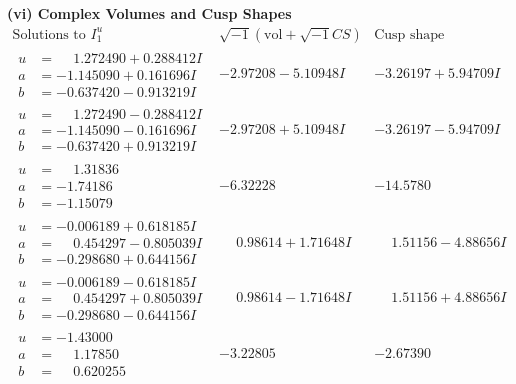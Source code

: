 \documentclass[1p]{elsarticle_modified}
\theoremstyle{definition}
\newcommand{\I}{\sqrt{-1}}
\begin{document}
\newpage\flushleft \textbf{(vi) Complex Volumes and Cusp Shapes}
$$\begin{array}{c|c|c}  
\text{Solutions to }I^u_{1}& \I (\text{vol} + \sqrt{-1}CS) & \text{Cusp shape}\\
 \hline 
\begin{aligned}
u &= \phantom{-}1.272490 + 0.288412 I \\
a &= -1.145090 + 0.161696 I \\
b &= -0.637420 - 0.913219 I\end{aligned}
 & -2.97208 - 5.10948 I & -3.26197 + 5.94709 I \\ \hline\begin{aligned}
u &= \phantom{-}1.272490 - 0.288412 I \\
a &= -1.145090 - 0.161696 I \\
b &= -0.637420 + 0.913219 I\end{aligned}
 & -2.97208 + 5.10948 I & -3.26197 - 5.94709 I \\ \hline\begin{aligned}
u &= \phantom{-}1.31836\phantom{ +0.000000I} \\
a &= -1.74186\phantom{ +0.000000I} \\
b &= -1.15079\phantom{ +0.000000I}\end{aligned}
 & -6.32228\phantom{ +0.000000I} & -14.5780\phantom{ +0.000000I} \\ \hline\begin{aligned}
u &= -0.006189 + 0.618185 I \\
a &= \phantom{-}0.454297 - 0.805039 I \\
b &= -0.298680 + 0.644156 I\end{aligned}
 & \phantom{-}0.98614 + 1.71648 I & \phantom{-}1.51156 - 4.88656 I \\ \hline\begin{aligned}
u &= -0.006189 - 0.618185 I \\
a &= \phantom{-}0.454297 + 0.805039 I \\
b &= -0.298680 - 0.644156 I\end{aligned}
 & \phantom{-}0.98614 - 1.71648 I & \phantom{-}1.51156 + 4.88656 I \\ \hline\begin{aligned}
u &= -1.43000\phantom{ +0.000000I} \\
a &= \phantom{-}1.17850\phantom{ +0.000000I} \\
b &= \phantom{-}0.620255\phantom{ +0.000000I}\end{aligned}
 & -3.22805\phantom{ +0.000000I} & -2.67390\phantom{ +0.000000I} \\ \hline\begin{aligned}

\end{aligned}
\end{array}$$
\end{document}
